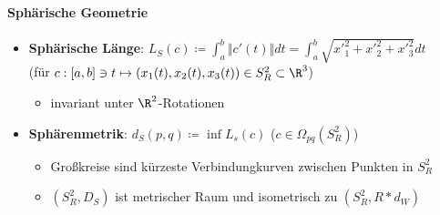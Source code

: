 \paragraph{Sphärische Geometrie}
\begin{itemize}
  \item \textbf{Sphärische Länge}: \( L_S(c) \coloneqq \int_a^b \Vert c'(t) \Vert dt = \int_a^b \sqrt{{x'}_1^2+{x'}_2^2+{x'}_3^2}dt \) \\
  (für \( c: [a,b] \ni t \mapsto (x_1(t), x_2(t), x_3(t)) \in S_R^2 \subset \R^3 \))
  \begin{itemize}
    \item invariant unter \( \R^2 \)-Rotationen
  \end{itemize}
  \item \textbf{Sphärenmetrik}: \( d_S(p,q) \coloneqq \inf L_s(c) \) (\( c \in \Omega_{pq}(S_R^2) \))
  \begin{itemize}
    \item Großkreise sind kürzeste Verbindungkurven zwischen Punkten in \( S_R^2 \)
    \item \( (S_R^2, D_S) \) ist metrischer Raum und isometrisch zu \( (S_R^2, R*d_W) \)
  \end{itemize}
\end{itemize}